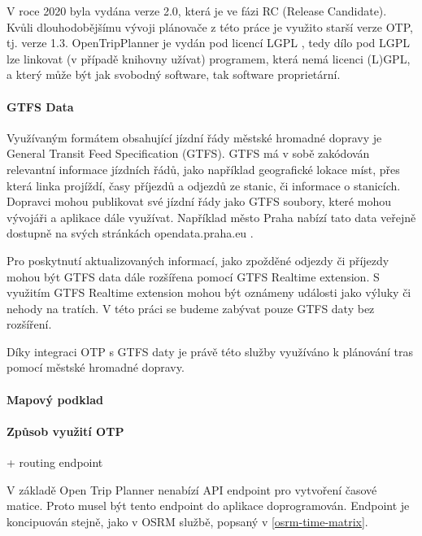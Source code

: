 \documentclass[thesis=M,czech]{FITthesis}[2019/12/23]
\theoremstyle{plain}
\theoremstyle{definition}
\begin{document}
V roce 2020 byla vydána verze 2.0, která je ve fázi RC (Release Candidate). Kvůli dlouhodobějšímu vývoji plánovače z této práce je využito starší verze OTP, tj. verze 1.3. OpenTripPlanner je vydán pod licencí LGPL \cite{lgpl}, tedy dílo pod LGPL lze linkovat (v případě knihovny užívat) programem, která nemá licenci (L)GPL, a který může být jak svobodný software, tak software proprietární.\cite{lgpl-stallman}




\paragraph{GTFS Data}

Využívaným formátem obsahující jízdní řády městské hromadné dopravy je General Transit Feed Specification (GTFS)\cite{gtfs-spec}. GTFS má v sobě zakódován relevantní informace jízdních řádů, jako například geografické lokace míst, přes která linka projíždí, časy příjezdů a odjezdů ze stanic, či informace o stanicích. Dopravci mohou publikovat své jízdní řády jako GTFS soubory, které mohou vývojáři a aplikace dále využívat. Například město Praha nabízí tato data veřejně dostupně na svých stránkách opendata.praha.eu \cite{gtfs-prague}. 

Pro poskytnutí aktualizovaných informací, jako zpožděné odjezdy či příjezdy mohou být GTFS data dále rozšířena pomocí GTFS Realtime extension. S využitím GTFS Realtime extension mohou být oznámeny události jako výluky či nehody na tratích. V této práci se budeme zabývat pouze GTFS daty bez rozšíření.

Díky integraci OTP s GTFS daty je právě této služby využíváno k plánování tras pomocí městské hromadné dopravy.




\paragraph{Mapový podklad}



\paragraph{Způsob využití OTP}


+ routing endpoint


V základě Open Trip Planner nenabízí API endpoint pro vytvoření časové matice\cite{otp-api-spec}. Proto musel být tento endpoint do aplikace doprogramován. Endpoint je koncipuován stejně, jako v OSRM službě, popsaný v \ref{osrm-time-matrix}.
\end{document}
